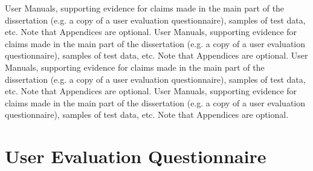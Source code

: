 \begin{appendices}
User Manuals, supporting evidence for claims made in the main part of the dissertation (e.g. a copy of a user evaluation questionnaire), samples of test data, etc. Note that Appendices are optional.
User Manuals, supporting evidence for claims made in the main part of the dissertation (e.g. a copy of a user evaluation questionnaire), samples of test data, etc. Note that Appendices are optional.
User Manuals, supporting evidence for claims made in the main part of the dissertation (e.g. a copy of a user evaluation questionnaire), samples of test data, etc. Note that Appendices are optional.
User Manuals, supporting evidence for claims made in the main part of the dissertation (e.g. a copy of a user evaluation questionnaire), samples of test data, etc. Note that Appendices are optional.


\chapter{User Evaluation Questionnaire}

\end{appendices}